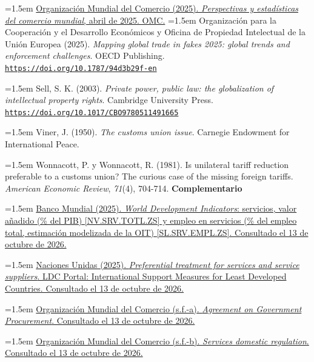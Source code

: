 \documentclass[10pt,a4paper]{article}
\begin{document}
\noindent\hangindent=1.5em \href{https://www.wto.org/spanish/res_s/publications_s/trade_outlook25_s.htm}{Organización Mundial del Comercio (2025). \textit{Perspectivas y estadísticas del comercio mundial}, abril de 2025. OMC.}
\noindent\hangindent=1.5em Organización para la Cooperación y el Desarrollo Económicos y Oficina de Propiedad Intelectual de la Unión Europea (2025). \textit{Mapping global trade in fakes 2025: global trends and enforcement challenges}. OECD Publishing. \href{https://doi.org/10.1787/94d3b29f-en}{\nolinkurl{https://doi.org/10.1787/94d3b29f-en}}

\noindent\hangindent=1.5em Sell, S. K. (2003). \textit{Private power, public law: the globalization of intellectual property rights}. Cambridge University Press. \href{https://doi.org/10.1017/CBO9780511491665}{\nolinkurl{https://doi.org/10.1017/CBO9780511491665}}

\noindent\hangindent=1.5em Viner, J. (1950). \textit{The customs union issue}. Carnegie Endowment for International Peace.

\noindent\hangindent=1.5em Wonnacott, P. y Wonnacott, R. (1981). Is unilateral tariff reduction preferable to a customs union? The curious case of the missing foreign tariffs. \textit{American Economic Review}, \textit{71}(4), 704-714.
\textbf{Complementario}

\noindent\hangindent=1.5em \href{https://data.worldbank.org/indicator/NV.SRV.TOTL.ZS}{Banco Mundial (2025). \textit{World Development Indicators}: servicios, valor añadido (\% del PIB) [NV.SRV.TOTL.ZS] y empleo en servicios (\% del empleo total, estimación modelizada de la OIT) [SL.SRV.EMPL.ZS]. Consultado el 13 de octubre de 2026.}

\noindent\hangindent=1.5em \href{https://www.un.org/ldcportal/node/768}{Naciones Unidas (2025). \textit{Preferential treatment for services and service suppliers}. LDC Portal: International Support Measures for Least Developed Countries. Consultado el 13 de octubre de 2026.}

\noindent\hangindent=1.5em \href{https://www.wto.org/english/tratop_e/gproc_e/gp_gpa_e.htm}{Organización Mundial del Comercio (s.f.-a). \textit{Agreement on Government Procurement}. Consultado el 13 de octubre de 2026.}

\noindent\hangindent=1.5em \href{https://www.wto.org/english/tratop_e/serv_e/jsdomreg_e.htm}{Organización Mundial del Comercio (s.f.-b). \textit{Services domestic regulation}. Consultado el 13 de octubre de 2026.}
\end{document}
